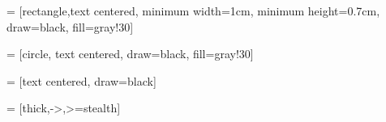  = [rectangle,text centered, minimum width=1cm, minimum height=0.7cm, draw=black, fill=gray!30]

 = [circle, text centered, draw=black, fill=gray!30]

 = [text centered, draw=black]

 = [thick,->,>=stealth]